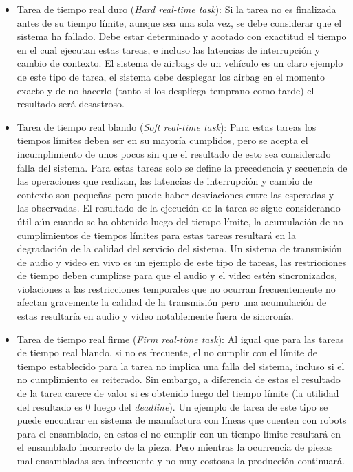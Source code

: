 \documentclass[withindex,glossary]{cam-thesis}
\begin{document}
\begin{itemize}[topsep=-11pt]
	\item Tarea de tiempo real duro (\textit{Hard real-time task}): Si la tarea no es finalizada antes de su tiempo límite, aunque sea una sola vez, se debe considerar que el sistema ha fallado. Debe estar determinado y acotado con exactitud el tiempo en el cual ejecutan estas tareas, e incluso las latencias de interrupción y cambio de contexto. El sistema de airbags de un vehículo es un claro ejemplo de este tipo de tarea, el sistema debe desplegar los airbag en el momento exacto y de no hacerlo (tanto si los despliega temprano como tarde) el resultado será desastroso.
    \item Tarea de tiempo real blando (\textit{Soft real-time task}): Para estas tareas los tiempos límites deben ser en su mayoría cumplidos, pero se acepta el incumplimiento de unos pocos sin que el resultado de esto sea considerado falla del sistema. Para estas tareas solo se define la precedencia y secuencia de las operaciones que realizan, las latencias de interrupción y cambio de contexto son pequeñas pero puede haber desviaciones entre las esperadas y las observadas. El resultado de la ejecución de la tarea se sigue considerando útil aún cuando se ha obtenido luego del tiempo límite, la acumulación de no cumplimientos de tiempos límites para estas tareas resultará en la degradación de la calidad del servicio del sistema. Un sistema de transmisión de audio y video en vivo es un ejemplo de este tipo de tareas, las restricciones de tiempo deben cumplirse para que el audio y el video estén sincronizados, violaciones a las restricciones temporales que no ocurran frecuentemente no afectan gravemente la calidad de la transmisión pero una acumulación de estas resultaría en audio y video notablemente fuera de sincronía.
    \item Tarea de tiempo real firme (\textit{Firm real-time task}): Al igual que para las tareas de tiempo real blando, si no es frecuente, el no cumplir con el límite de tiempo establecido para la tarea no implica una falla del sistema, incluso si el no cumplimiento es reiterado. Sin embargo, a diferencia de estas el resultado de la tarea carece de valor si es obtenido luego del tiempo límite (la utilidad del resultado es 0 luego del \textit{deadline}). Un ejemplo de tarea de este tipo se puede encontrar en sistema de manufactura con líneas que cuenten con robots para el ensamblado, en estos el no cumplir con un tiempo límite resultará en el ensamblado incorrecto de la pieza. Pero mientras la ocurrencia de piezas mal ensambladas sea infrecuente y no muy costosas la producción continuará.
\\[-7pt]
\end{itemize}
\end{document}
